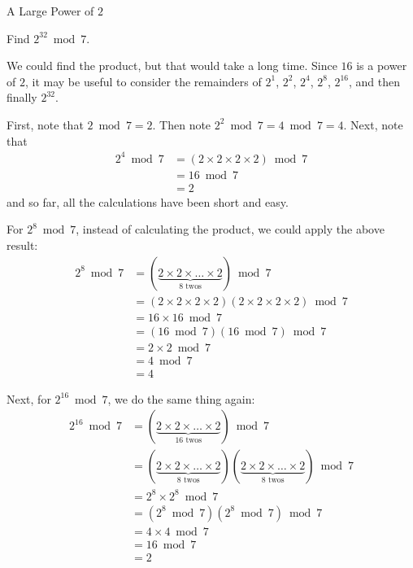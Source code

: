 \documentclass[a4paper,10pt]{report}
\begin{document}
\begin{problem}{A Large Power of $2$}

 Find $2^{32} \bmod 7$.

 \begin{solution}

  We could find the product, but that would take a long time. Since $16$ is a
  power of $2$, it may be useful to consider the remainders of $2^1$, $2^2$,
  $2^4$, $2^8$, $2^{16}$, and then finally $2^{32}$.

  First, note that $2 \bmod 7 = 2$. Then note $2^2 \bmod 7 = 4 \bmod 7 = 4$.
  Next, note that \begin{align*}
   2^4 \bmod 7
   &= (2 \times 2 \times 2 \times 2) \bmod 7 \\
   &= 16 \bmod 7 \\
   &= 2
  \end{align*} and so far, all the calculations have been short and easy.

  For $2^8 \bmod 7$, instead of calculating the product, we could apply the
  above result: \begin{align*}
   2^8 \bmod 7
   &= (\underbrace{2 \times 2 \times \dots \times 2}_{8\text{ twos}}) \bmod 7 \\
   &= (2 \times 2 \times 2 \times 2)(2 \times 2 \times 2 \times 2) \bmod 7 \\
   &= 16\times16 \bmod 7 \\
   &= (16 \bmod 7)(16 \bmod 7) \bmod 7 \\
   &= 2 \times 2 \bmod 7 \\
   &= 4 \bmod 7 \\
   &= 4
  \end{align*}

  Next, for $2^{16} \bmod 7$, we do the same thing again: \begin{align*}
   2^{16} \bmod 7
   &= (\underbrace{2 \times 2 \times \dots \times 2}_{16\text{ twos}}) \bmod 7 \\
   &= (\underbrace{2 \times 2 \times \dots \times 2}_{8\text{ twos}})
   (\underbrace{2 \times 2 \times \dots \times 2}_{8\text{ twos}}) \bmod 7 \\
   &= 2^8\times2^8 \bmod 7 \\
   &= (2^8 \bmod 7)(2^8 \bmod 7) \bmod 7 \\
   &= 4 \times 4 \bmod 7 \\
   &= 16 \bmod 7 \\
   &= 2
  \end{align*}


\end{solution}
\end{problem}
\end{document}
